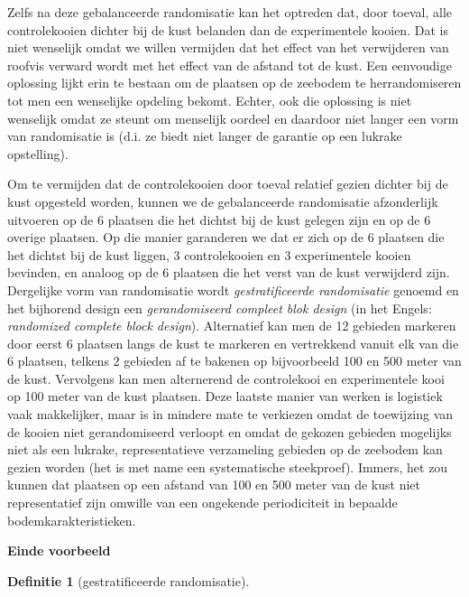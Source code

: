 \documentclass[
  12pt,dutch]{book}
\theoremstyle{definition}
\newtheorem{definition}{Definitie}[chapter]
\theoremstyle{definition}
\theoremstyle{definition}
\theoremstyle{definition}
\theoremstyle{remark}
\begin{document}
Zelfs na deze gebalanceerde randomisatie kan het optreden dat, door toeval, alle controlekooien dichter bij de kust belanden dan de experimentele kooien. Dat is niet wenselijk omdat we willen vermijden dat het effect van het verwijderen van roofvis verward wordt met het effect van de afstand tot de kust. Een eenvoudige oplossing lijkt erin te bestaan om de plaatsen op de zeebodem te herrandomiseren tot men een wenselijke opdeling bekomt. Echter, ook die oplossing is niet wenselijk omdat ze steunt om menselijk oordeel en daardoor niet langer een vorm van randomisatie is (d.i. ze biedt niet langer de garantie op een lukrake opstelling).

Om te vermijden dat de controlekooien door toeval relatief gezien dichter bij de kust opgesteld worden, kunnen we de gebalanceerde randomisatie afzonderlijk uitvoeren op de 6 plaatsen die het dichtst bij de kust gelegen zijn en op de 6 overige plaatsen. Op die manier garanderen we dat er zich op de 6 plaatsen die het dichtst bij de kust liggen, 3 controlekooien en 3 experimentele kooien bevinden, en analoog op de 6 plaatsen die het verst van de kust verwijderd zijn. Dergelijke vorm van randomisatie wordt \emph{gestratificeerde randomisatie}
genoemd en het bijhorend design een \emph{gerandomiseerd compleet blok design} (in het Engels: \emph{randomized complete block design}). Alternatief kan men de 12 gebieden markeren door eerst 6 plaatsen langs de kust te markeren en vertrekkend vanuit elk van die 6 plaatsen, telkens 2 gebieden af te bakenen op bijvoorbeeld 100 en 500 meter van de kust. Vervolgens kan men alternerend de controlekooi en experimentele kooi op 100 meter van de kust plaatsen. Deze laatste manier van werken is logistiek vaak makkelijker, maar is in mindere mate te verkiezen omdat de toewijzing van de kooien niet gerandomiseerd verloopt en omdat de gekozen gebieden mogelijks niet als een lukrake, representatieve verzameling gebieden op de zeebodem kan gezien worden (het is met name een systematische steekproef). Immers, het zou kunnen dat plaatsen op een afstand van 100 en 500 meter van de kust niet representatief zijn omwille van een ongekende periodiciteit in bepaalde bodemkarakteristieken.

\textbf{Einde voorbeeld}

\begin{definition}[gestratificeerde randomisatie]
\protect\hypertarget{def:unnamed-chunk-72}{}\label{def:unnamed-chunk-72}~
\end{definition}
\end{document}

